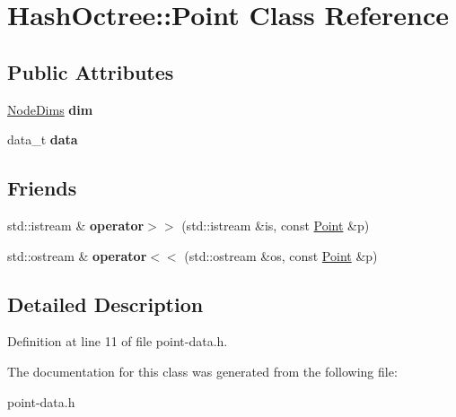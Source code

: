 \hypertarget{class_hash_octree_1_1_point}{}\section{Hash\+Octree\+::Point Class Reference}
\label{class_hash_octree_1_1_point}
\subsection*{Public Attributes}
\begin{DoxyCompactItemize}
\item 
\mbox{\label{class_hash_octree_1_1_point_a25bf5dc109d97354ba1f11c3e3931086}} 
\mbox{\hyperlink{class_hash_octree_1_1_node_dims}{Node\+Dims}} {\bfseries dim}
\item 
\mbox{\label{class_hash_octree_1_1_point_a5ed437d6d45a23601a468ccca3092d85}} 
data\+\_\+t {\bfseries data}
\end{DoxyCompactItemize}
\subsection*{Friends}
\begin{DoxyCompactItemize}
\item 
\mbox{\label{class_hash_octree_1_1_point_ac7c7e29a9e81197fa739bbf8fbfaacec}} 
std\+::istream \& {\bfseries operator$>$$>$} (std\+::istream \&is, const \mbox{\hyperlink{class_hash_octree_1_1_point}{Point}} \&p)
\item 
\mbox{\label{class_hash_octree_1_1_point_aab55cf13db83c55c46a961b2b2441960}} 
std\+::ostream \& {\bfseries operator$<$$<$} (std\+::ostream \&os, const \mbox{\hyperlink{class_hash_octree_1_1_point}{Point}} \&p)
\end{DoxyCompactItemize}


\subsection{Detailed Description}


Definition at line 11 of file point-\/data.\+h.



The documentation for this class was generated from the following file\+:\begin{DoxyCompactItemize}
\item 
point-\/data.\+h\end{DoxyCompactItemize}
